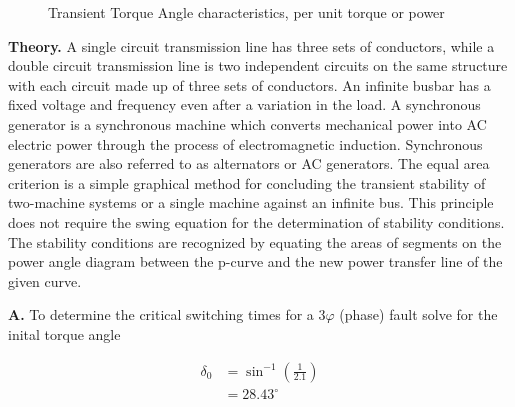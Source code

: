 \documentclass[main.tex]{subfiles}
\begin{document}
\begin{enumerate}
\begin{figure}
\centering{}
\caption{Transient Torque Angle characteristics, per unit torque or power}
\label{fig:24q_a}
\end{figure}

\textbf{Theory.} A single circuit transmission line has three sets of conductors, while a double circuit transmission line is two independent circuits on the same structure with each circuit made up of three sets of conductors. An infinite busbar has a fixed voltage and frequency even after a variation in the load. A synchronous generator is a synchronous machine which converts mechanical power into AC electric power through the process of electromagnetic induction. Synchronous generators are also referred to as alternators or AC generators. The equal area criterion is a simple graphical method for concluding the transient stability of two-machine systems or a single machine against an infinite bus. This principle does not require the swing equation for the determination of stability conditions. The stability conditions are recognized by equating the areas of segments on the power angle diagram between the p-curve and the new power transfer line of the given curve.

\textbf{A.} To determine the critical switching times for a $3 \varphi$ (phase) fault solve for the inital torque angle

$$
\begin{aligned}
\delta_0 &= \sin ^{-1}\left(\frac{1}{2.1}\right)\\
&=28.43^{\circ} \\
\end{aligned}
$$


\end{enumerate}
\end{document}
